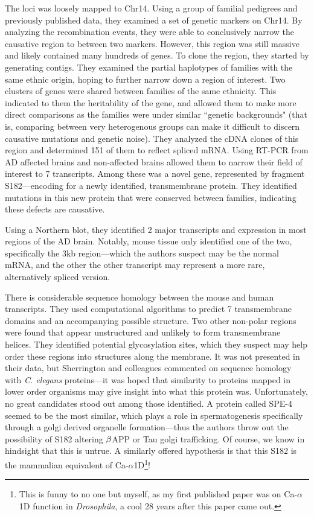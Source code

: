 The loci was loosely mapped to Chr14. Using a group of familial pedigrees and previously published data, they examined a set of genetic markers on Chr14. By analyzing the recombination events, they were able to conclusively narrow the causative region to between two markers. However, this region was still massive and likely contained many hundreds of genes. To clone the region, they started by generating contigs. They examined the partial haplotypes of families with the same ethnic origin, hoping to further narrow down a region of interest. Two clusters of genes were shared between families of the same ethnicity. This indicated to them the heritability of the gene, and allowed them to make more direct comparisons as the families were under similar ``genetic backgrounds" (that is, comparing between very heterogenous groups can make it difficult to discern causative mutations and genetic noise). They analyzed the cDNA clones of this region and determined 151 of them to reflect spliced mRNA. Using RT-PCR from AD affected brains and non-affected brains allowed them to narrow their field of interest to 7 transcripts. Among these was a novel gene, represented by fragment S182---encoding for a newly identified, transmembrane protein. They identified mutations in this new protein that were conserved between families, indicating these defects are causative.\newline 


Using a Northern blot, they identified 2 major transcripts and expression in most regions of the AD brain. Notably, mouse tissue only identified one of the two, specifically the 3kb region---which the authors suspect may be the normal mRNA, and the other the other transcript may represent a more rare, alternatively spliced version. \newline

There is considerable sequence homology between the mouse and human transcripts. They used computational algorithms to predict 7 transmembrane domains and an accompanying possible structure. Two other non-polar regions were found that appear unstructured and unlikely to form transmembrane helices. They identified potential glycosylation sites, which they suspect may help order these regions into structures along the membrane. It was not presented in their data, but Sherrington and colleagues commented on sequence homology with \textit{C. elegans} proteins---it was hoped that similarity to proteins mapped in lower order organisms may give insight into what this protein was. Unfortunately, no great candidates stood out among those identified. A protein called SPE-4 seemed to be the most similar, which plays a role in spermatogenesis specifically through a golgi derived organelle formation---thus the authors throw out the possibility of S182 altering $\beta$APP or Tau golgi trafficking. Of course, we know in hindsight that this is untrue. A similarly offered hypothesis is that this S182 is the mammalian equivalent of Ca-$\alpha$1D\footnote{This is funny to no one but myself, as my first published paper was on Ca-$\alpha$1D function in \textit{Drosophila}, a cool 28 years after this paper came out.}! \newline

